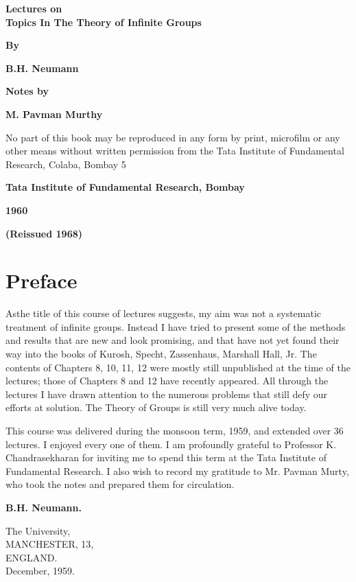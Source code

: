 \thispagestyle{empty}
\begin{center}
{\Large\bf Lectures on}\\[5pt] 
{\Large\bf Topics In The Theory of Infinite Groups}
\vskip 1cm

{\bf  By}
\medskip

{\large\bf  B.H. Neumann}
\vfill

{\bf  Notes by}
\medskip

{\large\bf  M. Pavman Murthy}
\vfill

\parbox{0.7\textwidth}{No part of this book may be 
reproduced in any form by print, microfilm or any 
other means without written permission from the 
Tata Institute of Fundamental Research, 
Colaba, Bombay 5}
\vfill


{\bf Tata Institute of Fundamental Research, Bombay}

{\bf 1960}

{\bf (Reissued 1968)}
\end{center}

\eject


\chapter{Preface}

As\pageoriginale the title of this course of lectures suggests, my aim was not a
systematic treatment of infinite groups. Instead I have tried to
present some of the methods and results that are new and look
promising, and that have not yet found their way into the books of
Kurosh, Specht, Zassenhaus, Marshall Hall, Jr. The contents of
Chapters 8, 10, 11, 12 were mostly still unpublished at the time of
the lectures; those of Chapters 8 and 12 have recently appeared. All
through the lectures I have drawn attention to the numerous problems
that still defy our efforts at solution. The Theory of Groups is still
very much alive today.

This course was delivered during the monsoon term, 1959, and extended
over 36 lectures. I enjoyed every one of them. I am profoundly
grateful to Professor K. Chandrasekharan for inviting me to spend this
term at the Tata Institute of Fundamental Research. I also wish to
record my gratitude to Mr. Pavman Murty, who took the notes and
prepared them for circulation.
\bigskip


\begin{flushright}
{\large\bf B.H. Neumann.}

The University,\\
MANCHESTER, 13,\\
ENGLAND.\\
December, 1959.
\end{flushright}
